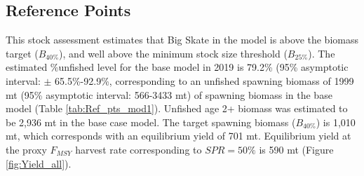 \documentclass[12pt,]{article}
\begin{document}
\FloatBarrier

\hypertarget{reference-points}{%
\subsection*{Reference Points}\label{reference-points}}

This stock assessment estimates that Big Skate in the model is above the
biomass target (\(B_{40\%}\)), and well above the minimum stock size
threshold (\(B_{25\%}\)). The estimated \%unfished level for the base
model in 2019 is 79.2\% (95\% asymptotic interval: \(\pm\)
65.5\%-92.9\%, corresponding to an unfished spawning biomass of 1999 mt
(95\% asymptotic interval: 566-3433 mt) of spawning biomass in the base
model (Table \ref{tab:Ref_pts_mod1}). Unfished age 2+ biomass was
estimated to be 2,936 mt in the base case model. The target spawning
biomass (\(B_{40\%}\)) is 1,010 mt, which corresponds with an
equilibrium yield of 701 mt. Equilibrium yield at the proxy \(F_{MSY}\)
harvest rate corresponding to \(SPR=50\%\) is 590 mt (Figure
\ref{fig:Yield_all}).

\vspace{.5cm}

\FloatBarrier
\end{document}
